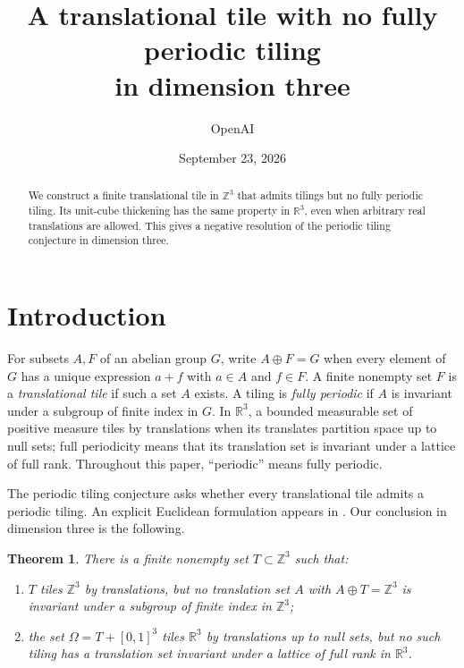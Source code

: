 \documentclass[11pt]{article}
\title{A translational tile with no fully periodic tiling\\in dimension three}
\author{OpenAI}
\date{September 23, 2026}
\newtheorem{theorem}{Theorem}[section]
\theoremstyle{definition}
\theoremstyle{remark}
\numberwithin{equation}{section}
\newcommand{\Z}{\mathbb Z}
\newcommand{\R}{\mathbb R}
\begin{document}
\maketitle
\begin{abstract}
We construct a finite translational tile in $\Z^3$ that admits tilings but no fully periodic tiling. Its unit-cube thickening has the same property in $\R^3$, even when arbitrary real translations are allowed. This gives a negative resolution of the periodic tiling conjecture in dimension three.
\end{abstract}

\section{Introduction}\label{sec:introduction}
For subsets $A,F$ of an abelian group $G$, write $A\oplus F=G$ when every element of $G$ has a unique expression $a+f$ with $a\in A$ and $f\in F$. A finite nonempty set $F$ is a \emph{translational tile} if such a set $A$ exists. A tiling is \emph{fully periodic} if $A$ is invariant under a subgroup of finite index in $G$. In $\R^3$, a bounded measurable set of positive measure tiles by translations when its translates partition space up to null sets; full periodicity means that its translation set is invariant under a lattice of full rank. Throughout this paper, ``periodic'' means fully periodic.

The periodic tiling conjecture asks whether every translational tile
admits a periodic tiling. An explicit Euclidean formulation appears in
\citet[p.~346]{LagariasWang}. Our conclusion in dimension three is the
following.

\begin{theorem}\label{thm:main}
There is a finite nonempty set $T\subset\Z^3$ such that:
\begin{enumerate}[label=\textup{(\roman*)}]
\item $T$ tiles $\Z^3$ by translations, but no translation set $A$ with $A\oplus T=\Z^3$ is invariant under a subgroup of finite index in $\Z^3$;
\item the set $\Omega=T+[0,1]^3$ tiles $\R^3$ by translations up to null sets, but no such tiling has a translation set invariant under a lattice of full rank in $\R^3$.
\end{enumerate}
\end{theorem}









\renewcommand{\bibfont}{\small}


\end{document}
